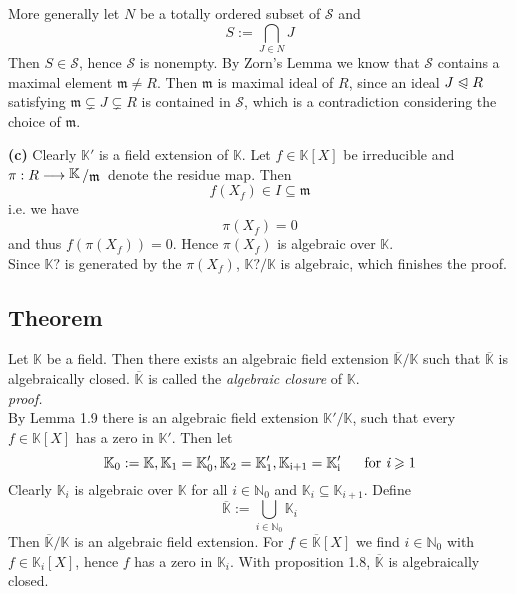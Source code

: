 \documentclass[12pt]{book}
\newcommand{\slant}[2]{{\raisebox{.1em}{$#1$}\left/\raisebox{-.1em}{$#2$}\right.}}
\begin{document}
\begin{spacing}{1.3}
\begin{compactenum}
More generally let $N$ be a totally ordered subset of $\mathcal{S}$ and $$S:=\bigcap_{J \in N} J$$Then $S \in \mathcal{S}$, hence $\mathcal{S}$ is nonempty. By Zorn's Lemma we know that $\mathcal{S}$ contains a maximal element $\mathfrak{m}\neq R$. Then $\mathfrak{m}$ is maximal ideal of $R$, since an ideal $J \trianglelefteqslant R$ satisfying $\mathfrak{m} \subsetneq J \subsetneq R$ is contained in $\mathcal{S}$, which is a contradiction considering the choice of $\mathfrak{m}$.
\item[\textbf{(c)}] Clearly $\mathbb{K}'$ is a field extension of $\mathbb{K}$.
Let $f \in \mathbb{K}[X]$ be irreducible and\\ $\pi: R \longrightarrow \slant{\mathbb{K}}{\mathfrak{m}}$ denote the residue map. Then $$f(X_f) \in I \subseteq \mathfrak{m}$$i.e. we have $$\pi(X_f)=0$$ and thus $f\left(\pi(X_f)\right)=0$. Hence $\pi(X_f)$ is algebraic over $\mathbb{K}$.\\
Since $\mathbb{K}?$ is generated by the $\pi(X_f)$, $\mathbb{K}?/\mathbb{K}$ is algebraic, which finishes the proof.
\end{compactenum}

\subsection{Theorem} %
Let $\mathbb{K}$ be a field. Then there exists an algebraic field extension $\overline{\mathbb{K}}/\mathbb{K}$ such that $\overline{\mathbb{K}}$ is algebraically closed. $\overline{\mathbb{K}}$ is called the \textit{algebraic closure} of $\mathbb{K}$.\\
\textit{proof.}\\
By Lemma 1.9 there is an algebraic field extension $\mathbb{K}'/\mathbb{K}$, such that every $f \in \mathbb{K}[X]$ has a zero in $\mathbb{K}'$.
Then let $$\mathbb{K}_0:=\mathbb{K}, \rm{ }\mathbb{K}_1=\mathbb{K}_0', \rm{ }\mathbb{K}_2=\mathbb{K}_1', \mathbb{K}_{i+1}=\mathbb{K}_i' \textrm{ }\quad \textrm{ for } \textit{i} \geqslant 1$$
Clearly $\mathbb{K}_i$ is algebraic over $\mathbb{K}$ for all $i \in \mathbb{N}_0$ and $\mathbb{K}_i \subseteq \mathbb{K}_{i+1}$.
Define $$\overline{\mathbb{K}}:= \bigcup_{i \in \mathbb{N}_0} \mathbb{K}_i$$Then $\overline{\mathbb{K}}/\mathbb{K}$ is an algebraic field extension. For $f \in \overline{\mathbb{K}}[X]$ we find $i \in \mathbb{N}_0$ with $f \in \mathbb{K}_i[X]$, hence $f$ has a zero in $\mathbb{K}_i$. With proposition 1.8, $\overline{\mathbb{K}}$ is algebraically closed.


\end{spacing}
\end{document}
